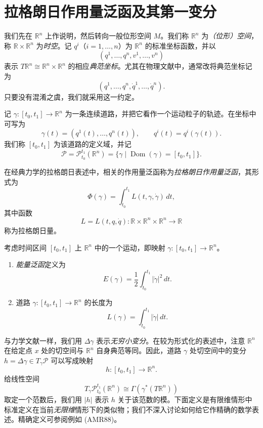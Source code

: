 \section{拉格朗日作用量泛函及其第一变分}
\label{sec:lagrangian-action-first-variation}

我们先在 $\mathbb R^n$ 上作说明，然后转向一般位形空间 $M$。我们称 $\mathbb R^n$ 为\emph{（位形）空间}，称 $\mathbb R\times\mathbb R^n$ 为\emph{时空}。记 $q^i$（$i=1,\ldots,n$）为 $\mathbb R^n$ 的标准坐标函数，并以
\[
  (q^1,\ldots,q^n,v^1,\ldots,v^n)
\]
表示 $T\mathbb R^n\cong\mathbb R^n\times\mathbb R^n$ 的相应\emph{典范坐标}。尤其在物理文献中，通常改将典范坐标记为
\[
  (q^1,\ldots,q^n,\dot q^1,\ldots,\dot q^n).
\]
只要没有混淆之虞，我们就采用这一约定。

记 $\gamma:[t_0,t_1]\to\mathbb R^n$ 为一条连续道路，并把它看作一个运动粒子的轨迹。在坐标中可写为
\[
  \gamma(t)=(q^1(t),\ldots,q^n(t)),
  \qquad q^i(t)=q^i(\gamma(t)).
\]
我们称 $[t_0,t_1]$ 为该道路的定义域，并记
\[
  \mathcal P=\mathcal P_{t_0}^{t_1}(\mathbb R^n)
  =\{\gamma\mid\operatorname{Dom}(\gamma)=[t_0,t_1]\}.
\]

在经典力学的拉格朗日表述中，相关的作用量泛函称为\emph{拉格朗日作用量泛函}，其形式为
\[
  \Phi(\gamma)=\int_{t_0}^{t_1}L(t,\gamma,\dot\gamma)\,dt,
\]
其中函数
\[
  L=L(t,q,\dot q):\mathbb R\times\mathbb R^n\times\mathbb R^n\to\mathbb R
\]
称为拉格朗日量。

\begin{example}
\label{ex:energy-and-length}
考虑时间区间 $[t_0,t_1]$ 上 $\mathbb R^n$ 中的一个运动，即映射 $\gamma:[t_0,t_1]\to\mathbb R^n$。
\begin{enumerate}[label=(\roman*)]
  \item \emph{能量泛函}定义为
  \[
    E(\gamma)=\frac12\int_{t_0}^{t_1}|\dot\gamma|^2\,dt.
  \]
  \item 道路 $\gamma:[t_0,t_1]\to\mathbb R^n$ 的长度为
  \[
    L(\gamma)=\int_{t_0}^{t_1}|\dot\gamma|\,dt.
  \]
\end{enumerate}
\end{example}

与力学文献一样，我们用 $\Delta\gamma$ 表示\emph{无穷小变分}。在较为形式化的表述中，注意 $\mathbb R^n$ 在给定点 $x$ 处的切空间与 $\mathbb R^n$ 自身典范等同。因此，道路 $\gamma$ 处切空间中的变分 $h=\Delta\gamma\in T_\gamma\mathcal P$ 可以写成映射
\[
  h:[t_0,t_1]\to\mathbb R^n.
\]
给线性空间
\[
  T_\gamma\mathcal P_{t_0}^{t_1}(\mathbb R^n)
  \cong\Gamma(\gamma^*(T\mathbb R^n))
\]
取定一个范数后，我们用 $|h|$ 表示 $h$ 关于该范数的模。下面定义是有限维情形中标准定义在当前\emph{无限维}情形下的类似物；我们不深入讨论如何给它作精确的数学表述。精确定义可参阅例如 (AMR88)。

